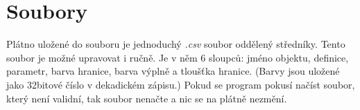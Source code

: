 \documentclass[11pt]{article}
\begin{document}
    \section{Soubory}
    Plátno uložené do souboru je jednoduchý \textit{.csv} soubor oddělený středníky. Tento soubor je možné upravovat i ručně. Je v něm 6 sloupců: jméno objektu, definice, parametr, barva hranice, barva výplně a tloušťka hranice. (Barvy jsou uložené jako 32bitové číslo v dekadickém zápisu.) Pokud se program pokusí načíst soubor, který není validní, tak soubor nenačte a nic se na plátně nezmění.
\end{document}
